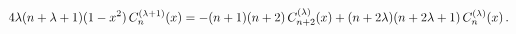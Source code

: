 \[4\lambda(n+\lambda+1)(1-x^{2})\mathop{C^{(\lambda+1)}_{n}\/}\nolimits\!\left(x%
\right)=-(n+1)(n+2)\mathop{C^{(\lambda)}_{n+2}\/}\nolimits\!\left(x\right)+(n+%
2\lambda)(n+2\lambda+1)\mathop{C^{(\lambda)}_{n}\/}\nolimits\!\left(x\right).\]